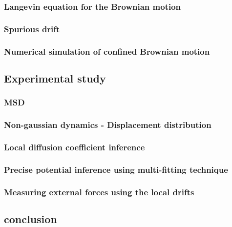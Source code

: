 \subsubsection{Langevin equation for the Brownian motion}



\subsubsection{Spurious drift}

\subsubsection{Numerical simulation of confined Brownian motion}

\subsection{Experimental study}

\subsubsection{MSD}

\subsubsection{Non-gaussian dynamics - Displacement distribution}

\subsubsection{Local diffusion coefficient inference}

\subsubsection{Precise potential inference using multi-fitting technique}

\subsubsection{Measuring external forces using the local drifts}

\subsection{conclusion}
